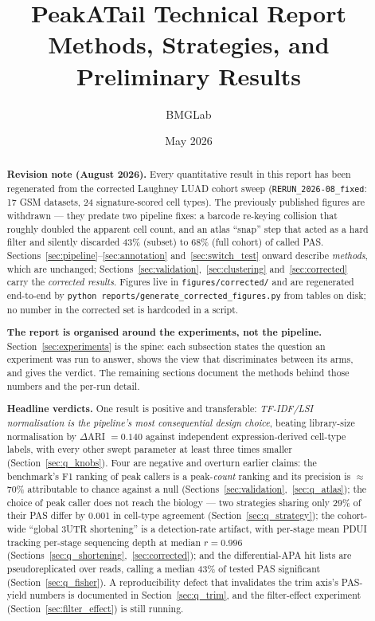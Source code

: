 \documentclass[11pt,a4paper]{article}
\title{PeakATail Technical Report\\[0.4em]\large Methods, Strategies, and Preliminary Results}
\author{BMGLab}
\date{May 2026}
\begin{document}
\maketitle

\begin{abstract}
\noindent \textbf{Revision note (August 2026).} Every quantitative result in this
report has been regenerated from the corrected Laughney LUAD cohort sweep
(\texttt{RERUN\_2026-08\_fixed}: 17 GSM datasets, 24 signature-scored cell types).
The previously published figures are withdrawn --- they predate two pipeline fixes:
a barcode re-keying collision that roughly doubled the apparent cell count, and an
atlas ``snap'' step that acted as a hard filter and silently discarded 43\% (subset)
to 68\% (full cohort) of called PAS. Sections~\ref{sec:pipeline}--\ref{sec:annotation}
and~\ref{sec:switch_test} onward describe \emph{methods}, which are unchanged;
Sections~\ref{sec:validation},~\ref{sec:clustering} and~\ref{sec:corrected} carry the
\emph{corrected results}. Figures live in \texttt{figures/corrected/} and are
regenerated end-to-end by \texttt{python reports/generate\_corrected\_figures.py}
from tables on disk; no number in the corrected set is hardcoded in a script.
\medskip

\noindent \textbf{The report is organised around the experiments, not the
pipeline.} Section~\ref{sec:experiments} is the spine: each subsection states the
question an experiment was run to answer, shows the view that discriminates
between its arms, and gives the verdict. The remaining sections document the
methods behind those numbers and the per-run detail.

\medskip
\noindent \textbf{Headline verdicts.} One result is positive and transferable:
\emph{TF-IDF/LSI normalisation is the pipeline's most consequential design
choice}, beating library-size normalisation by $\Delta$ARI $= 0.140$ against
independent expression-derived cell-type labels, with every other swept parameter
at least three times smaller (Section~\ref{sec:q_knobs}). Four are negative and
overturn earlier claims: the benchmark's F1 ranking of peak callers is a
peak-\emph{count} ranking and its precision is $\approx$70\% attributable to
chance against a null (Sections~\ref{sec:validation},~\ref{sec:q_atlas}); the
choice of peak caller does not reach the biology --- two strategies sharing only
29\% of their PAS differ by 0.001 in cell-type agreement
(Section~\ref{sec:q_strategy}); the cohort-wide ``global
3\textquotesingle{}UTR shortening'' is a detection-rate artifact, with per-stage
mean PDUI tracking per-stage sequencing depth at median $r = 0.996$
(Sections~\ref{sec:q_shortening},~\ref{sec:corrected}); and the differential-APA
hit lists are pseudoreplicated over reads, calling a median 43\% of tested PAS
significant (Section~\ref{sec:q_fisher}). A reproducibility defect that
invalidates the trim axis's PAS-yield numbers is documented in
Section~\ref{sec:q_trim}, and the filter-effect experiment
(Section~\ref{sec:filter_effect}) is still running.
\end{abstract}
\end{document}
